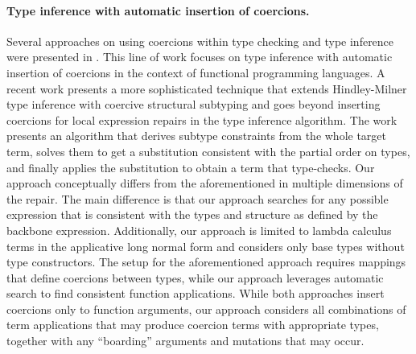 \paragraph{{\bf Type inference with automatic insertion of coercions.}}
Several approaches on using coercions within type checking and type inference
were presented in \cite{Mitchell:1984:CTI:800017.800529,Luo:2008:CPT:1394781.1394785}.
This line of work focuses on type inference with automatic insertion of coercions in the
context of functional programming languages.
A recent work \cite{Traytel:2011:EHT:2183641.2183654} presents a more sophisticated technique that extends Hindley-Milner
type inference with coercive structural subtyping and goes beyond inserting coercions for
local expression repairs in the type inference algorithm.
The work presents an algorithm that derives subtype constraints from the whole target
term, solves them to get a substitution consistent with the partial order on types, and
finally applies the substitution to obtain a term that type-checks.
Our approach conceptually differs from the aforementioned in multiple dimensions of the
repair.
The main difference is that our approach searches for any possible expression that is
consistent with the types and structure as defined by the backbone expression.
Additionally, our approach is limited to lambda calculus terms in the
applicative long normal form and considers only base types without type
constructors.
The setup for the aforementioned approach requires mappings that define
coercions between types, while our approach leverages automatic search to find
consistent function applications.
While both approaches insert coercions only to function arguments, our approach
considers all combinations of term applications that may produce coercion terms with
appropriate types, together with any ``boarding'' arguments and mutations that may occur.



\vspace{-0.5em}
